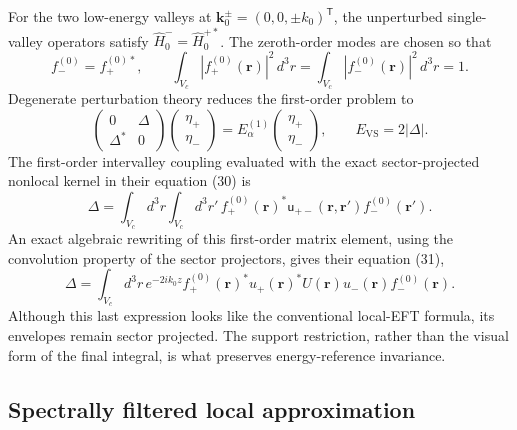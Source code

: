 For the two low-energy valleys at
$\mathbf k_0^{\pm}=(0,0,\pm k_0)^{\mathsf T}$, the unperturbed single-valley
operators satisfy $\hat H_0^{-}=\hat H_0^{+*}$. The zeroth-order modes are
chosen so that
\begin{equation}
  f_-^{(0)}=f_+^{(0)*},
  \qquad
  \int_{V_c}|f_+^{(0)}(\mathbf r)|^2\,d^3r
  =
  \int_{V_c}|f_-^{(0)}(\mathbf r)|^2\,d^3r
  =1.
  \label{eq:ermoneit-valley-mode-normalization}
\end{equation}
Degenerate perturbation theory reduces the first-order problem to
\begin{equation}
  \begin{pmatrix}0&\Delta\\\Delta^{*}&0\end{pmatrix}
  \begin{pmatrix}\eta_+\\\eta_-\end{pmatrix}
  =
  E_\alpha^{(1)}
  \begin{pmatrix}\eta_+\\\eta_-\end{pmatrix},
  \qquad
  E_{\mathrm{VS}}=2|\Delta|.
  \label{eq:ermoneit-valley-splitting-matrix}
\end{equation}
The first-order intervalley coupling evaluated with the exact sector-projected
nonlocal kernel in their equation (30) is
\begin{equation}
  \Delta
  =
  \int_{V_c}\!d^3r\int_{V_c}\!d^3r'\,
  f_{+}^{(0)}(\mathbf r)^{*}
  \mathsf u_{+-}(\mathbf r,\mathbf r')
  f_{-}^{(0)}(\mathbf r').
  \label{eq:ermoneit-nonlocal-intervalley-coupling}
\end{equation}
An exact algebraic rewriting of this first-order matrix element, using the
convolution property of the sector projectors, gives their equation (31),
\begin{equation}
  \Delta
  =
  \int_{V_c}\!d^3r\,
  e^{-2ik_0z}
  f_{+}^{(0)}(\mathbf r)^{*}
  u_{+}(\mathbf r)^{*}U(\mathbf r)
  u_{-}(\mathbf r)f_{-}^{(0)}(\mathbf r).
  \label{eq:ermoneit-local-looking-exact-coupling}
\end{equation}
Although this last expression looks like the conventional local-EFT formula,
its envelopes remain sector projected. The support restriction, rather than the
visual form of the final integral, is what preserves energy-reference
invariance.

\subsection{Spectrally filtered local approximation}

